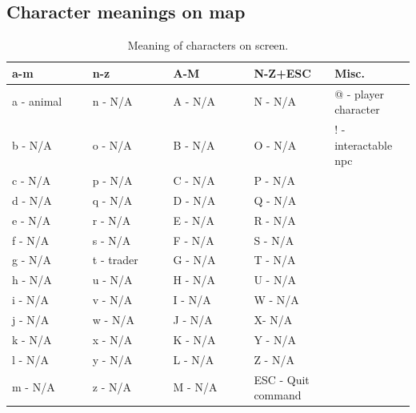 \documentclass{report}
\begin{document}
\subsection{Character meanings on map}
\begin{table}[h!]

\begin{tabular}{|p{0.2\linewidth}|p{0.2\linewidth}| p{0.2\linewidth}|p{0.2\linewidth}|p{0.2\linewidth}|} 
\hline
 a-m & n-z & A-M & N-Z+ESC & Misc. \\ [0.5ex] 
 \hline
 a - animal & n - N/A & A - N/A & N - N/A & @ - player character\\ 
 b - N/A & o - N/A & B - N/A & O - N/A  & ! - interactable npc \\ 
 c - N/A & p - N/A & C - N/A & P - N/A \\
 d - N/A & q - N/A & D - N/A & Q - N/A  \\
 e - N/A & r - N/A & E - N/A & R - N/A \\
 f - N/A & s - N/A & F - N/A & S - N/A \\
 g - N/A & t - trader & G - N/A & T - N/A \\
 h - N/A & u - N/A & H - N/A & U - N/A \\
 i - N/A & v - N/A & I - N/A & W - N/A \\
 j - N/A & w - N/A & J - N/A & X- N/A \\
 k - N/A & x - N/A & K - N/A & Y - N/A \\
 l - N/A & y - N/A & L - N/A & Z - N/A \\
 m - N/A & z - N/A & M - N/A & ESC - Quit command \\ [1ex] 
 \hline
\end{tabular}
\caption{Meaning of characters on screen.}
\label{table:1}
\end{table}
\end{document}
